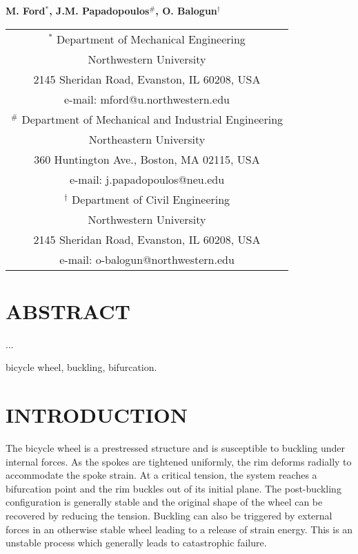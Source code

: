 \documentclass{bmd2016p}
\begin{document}
\begin{center}
\end{center}

\begin{center}
\normalsize{\bf{M. Ford$^{*}$, J.M. Papadopoulos$^\#$, 
            O. Balogun$^\dag$}}
\end{center} 

\begin{center}
\begin{tabular}{c}
$^*$ Department of Mechanical Engineering\\
Northwestern University\\
2145 Sheridan Road, Evanston, IL 60208, USA\\
e-mail: mford@u.northwestern.edu\\[2.5ex]

$^\#$ Department of Mechanical and Industrial Engineering\\
Northeastern University\\
360 Huntington Ave., Boston, MA 02115, USA\\
e-mail: j.papadopoulos@neu.edu\\[2.5ex]

$^\dag$ Department of Civil Engineering\\
Northwestern University\\
2145 Sheridan Road, Evanston, IL 60208, USA\\
e-mail: o-balogun@northwestern.edu\\
\end{tabular}
\end{center}

\section*{ABSTRACT}

...

\begin{keywords}
bicycle wheel, 
buckling, 
bifurcation.
\end{keywords}





\section{INTRODUCTION}

The bicycle wheel is a prestressed structure and is susceptible to buckling under internal forces. As the spokes are tightened uniformly, the rim deforms radially to accommodate the spoke strain. At a critical tension, the system reaches a bifurcation point and the rim buckles out of its initial plane. The post-buckling configuration is generally stable and the original shape of the wheel can be recovered by reducing the tension. Buckling can also be triggered by external forces in an otherwise stable wheel leading to a release of strain energy. This is an unstable process which generally leads to catastrophic failure.
\end{document}
